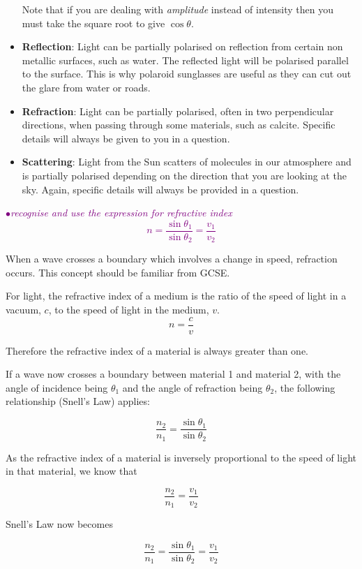 \documentclass[a4paper,11pt,twoside]{memoir}
\newcounter{spec}[chapter]
\newcommand{\spec}[1]{\Needspace{5\baselineskip}\textcolor{purple}{$\bullet$\hspace{0.5cm}\textit{#1}}}
\begin{document}
\begin{itemize}
Note that if you are dealing with \emph{amplitude} instead of intensity then you must take the square root to give $\cos\theta$.

\item\textbf{Reflection}: Light can be partially polarised on reflection from certain non metallic surfaces, such as water. The reflected light will be polarised parallel to the surface. This is why polaroid sunglasses are useful as they can cut out the glare from water or roads.

\item\textbf{Refraction}: Light can be partially polarised, often in two perpendicular directions, when passing through some materials, such as calcite. Specific details will always be given to you in a question.

\item\textbf{Scattering}: Light from the Sun scatters of molecules in our atmosphere and is partially polarised depending on the direction that you are looking at the sky. Again, specific details will always be provided in a question.

\end{itemize}

\spec{recognise and use the expression for refractive index
\[ n = \frac{\sin{\theta_1}}{\sin{\theta_2}} = \frac{v_1}{v_2}\]}

When a wave crosses a boundary which involves a change in speed, refraction occurs. This concept should be familiar from GCSE.


For light, the refractive index of a medium is the ratio of the speed of light in a vacuum, $c$, to the speed of light in the medium, $v$.
\[n = \frac{c}{v}\]

Therefore the refractive index of a material is always greater than one.

If a wave now crosses a boundary between material 1 and material 2, with the angle of incidence being $\theta_1$ and the angle of refraction being $\theta_2$, the following relationship (Snell's Law) applies:

\[ \frac{n_2}{n_1} = \frac{\sin{\theta_1}}{\sin{\theta_2}}\]

As the refractive index of a material is inversely proportional to the speed of light in that material, we know that

\[\frac{n_2}{n_1} = \frac{v_1}{v_2} \]

Snell's Law now becomes

\[ \frac{n_2}{n_1} = \frac{\sin{\theta_1}}{\sin{\theta_2}} =  \frac{v_1}{v_2}\]
\end{document}
